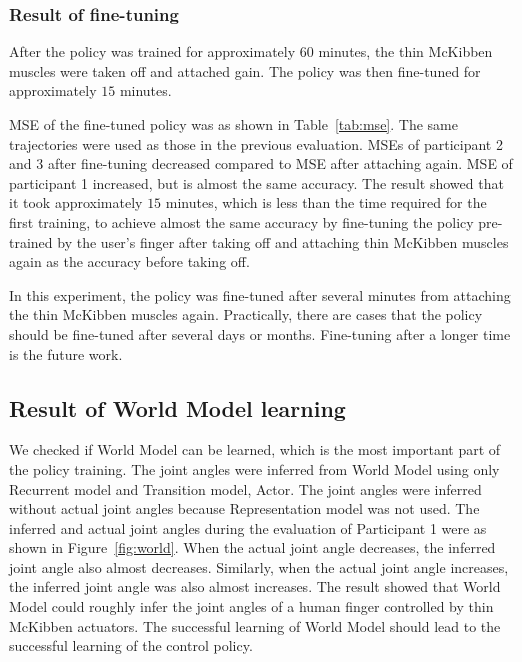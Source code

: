 \documentclass[letterpaper, 10 pt, conference]{ieeeconf}  %
\newcommand{\figref}{Figure~\ref}
\newcommand{\tabref}{Table~\ref}
\begin{document}
\subsubsection{Result of fine-tuning}\label{fine}

After the policy was trained for approximately $60$ minutes, the thin McKibben muscles were taken off and attached gain. The policy was then fine-tuned for approximately $15$ minutes.

MSE of the fine-tuned policy was as shown in \tabref{tab:mse}. The same trajectories were used as those in the previous evaluation.
MSEs of participant 2 and 3 after fine-tuning decreased compared to MSE after attaching again. MSE of participant 1 increased, but is almost the same accuracy.
The result showed that it took approximately $15$ minutes, which is less than the time required for the first training, to achieve almost the same accuracy by fine-tuning the policy pre-trained by the user’s finger after taking off and attaching thin McKibben muscles again as the accuracy before taking off.

In this experiment, the policy was fine-tuned after several minutes from attaching the thin McKibben muscles again. Practically, there are cases that the policy should be fine-tuned after several days or months. Fine-tuning after a longer time is the future work.

\subsection{Result of World Model learning}

We checked if World Model can be learned, which is the most important part of the policy training.
The joint angles were inferred from World Model using only Recurrent model and Transition model, Actor. The joint angles were inferred without actual joint angles because Representation model was not used.
The inferred and actual joint angles during the evaluation of Participant 1 were as shown in \figref{fig:world}.
When the actual joint angle decreases, the inferred joint angle also almost decreases. Similarly, when the actual joint angle increases, the inferred joint angle was also almost increases.
The result showed that World Model could roughly infer the joint angles of a human finger controlled by thin McKibben actuators. The successful learning of World Model should lead to the successful learning of the control policy.
\end{document}
